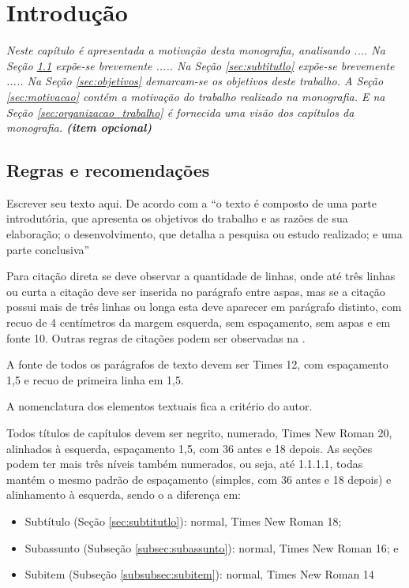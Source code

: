 \chapter{Introdução}
\begin{flushright}
	\begin{minipage}{14.0cm}
			\setlength{\parindent}{0cm}
			\textit{Neste capítulo é apresentada a motivação desta monografia, analisando .... Na Seção \ref{sec:regras_recomendacoes} expõe-se brevemente ..... Na Seção \ref{sec:subtitutlo} expõe-se brevemente ..... Na Seção \ref{sec:objetivos} demarcam-se os objetivos deste trabalho. A Seção \ref{sec:motivacao} contém a motivação do trabalho realizado na monografia. E na Seção \ref{sec:organizacao_trabalho} é fornecida uma visão dos capítulos da monografia. \textbf{(item opcional)}}
	\end{minipage}
\end{flushright}

\section{Regras e recomendações}\label{sec:regras_recomendacoes}
Escrever seu texto aqui. De acordo com a \cite{NBR14724:2011} ``o texto é composto de uma parte introdutória, que apresenta os objetivos do trabalho e as razões de sua elaboração; o desenvolvimento, que detalha a pesquisa ou estudo realizado; e uma parte conclusiva''

Para citação direta se deve observar a quantidade de linhas, onde até três linhas ou curta a citação deve ser inserida no parágrafo entre aspas, mas se a citação possui mais de três linhas ou longa esta deve aparecer em parágrafo distinto, com recuo de 4 centímetros da margem esquerda, sem espaçamento, sem aspas e em fonte 10. Outras regras de citações podem ser observadas na \cite{NBR10520:2002}.

A fonte de todos os parágrafos de texto devem ser Times 12, com espaçamento 1,5 e recuo de primeira linha em 1,5.

A nomenclatura dos elementos textuais fica a critério do autor.

Todos títulos de capítulos devem ser negrito, numerado, Times New Roman 20, alinhados à esquerda, espaçamento 1,5, com 36 antes e 18 depois. As seções podem ter mais três níveis também numerados, ou seja, até 1.1.1.1, todas mantém o mesmo padrão de espaçamento (simples, com 36 antes e 18 depois) e alinhamento à esquerda, sendo o a diferença em:
\begin{itemize}
	\setlength\itemsep{-0.17cm}
	\item Subtítulo (Seção \ref{sec:subtitutlo}): normal, Times New Roman 18;
	\item Subassunto (Subseção \ref{subsec:subassunto}): normal, Times New Roman 16; e
	\item Subitem (Subseção \ref{subsubsec:subitem}): normal, Times New Roman 14
\end{itemize}

